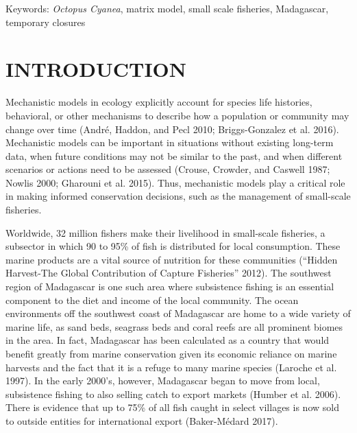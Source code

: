 \documentclass[
]{article}
\begin{document}
Keywords: \emph{Octopus Cyanea}, matrix model, small scale fisheries, Madagascar, temporary closures

\hypertarget{introduction}{%
\section{INTRODUCTION}\label{introduction}}

Mechanistic models in ecology explicitly account for species life histories, behavioral, or other mechanisms to describe how a population or community may change over time (André, Haddon, and Pecl 2010; Briggs-Gonzalez et al. 2016). Mechanistic models can be important in situations without existing long-term data, when future conditions may not be similar to the past, and when different scenarios or actions need to be assessed (Crouse, Crowder, and Caswell 1987; Nowlis 2000; Gharouni et al. 2015). Thus, mechanistic models play a critical role in making informed conservation decisions, such as the management of small-scale fisheries.

Worldwide, 32 million fishers make their livelihood in small-scale fisheries, a subsector in which 90 to 95\% of fish is distributed for local consumption. These marine products are a vital source of nutrition for these communities ({``Hidden {Harvest}-{The} {Global} {Contribution} of {Capture} {Fisheries}''} 2012). The southwest region of Madagascar is one such area where subsistence fishing is an essential component to the diet and income of the local community. The ocean environments off the southwest coast of Madagascar are home to a wide variety of marine life, as sand beds, seagrass beds and coral reefs are all prominent biomes in the area. In fact, Madagascar has been calculated as a country that would benefit greatly from marine conservation given its economic reliance on marine harvests and the fact that it is a refuge to many marine species (Laroche et al. 1997). In the early 2000's, however, Madagascar began to move from local, subsistence fishing to also selling catch to export markets (Humber et al. 2006). There is evidence that up to 75\% of all fish caught in select villages is now sold to outside entities for international export (Baker-Médard 2017).
\end{document}
